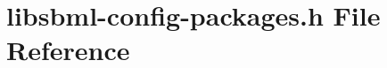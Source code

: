 \hypertarget{libsbml-config-packages_8h}{}\section{libsbml-\/config-\/packages.h File Reference}
\label{libsbml-config-packages_8h}
